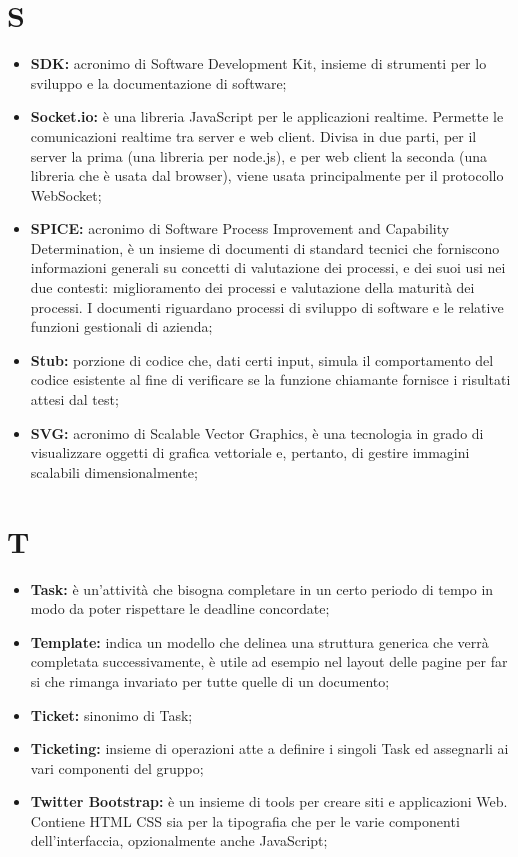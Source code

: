 \section*{\Huge S} %
\label{sec:s}
	\begin{itemize}
		\item \textbf{SDK:} acronimo di Software Development Kit, insieme di strumenti per lo sviluppo e la documentazione di software;	
		\item \textbf{Socket.io:} è una libreria JavaScript per le applicazioni realtime. Permette le comunicazioni realtime tra server e web client. Divisa in due parti, per il server la prima (una libreria per node.js), e per web client la seconda (una libreria che è usata dal browser), viene usata principalmente per il protocollo WebSocket;
		\item \textbf{SPICE:} acronimo di Software Process Improvement and Capability Determination, è un insieme di documenti di standard tecnici che forniscono informazioni generali su concetti di valutazione dei processi, e dei suoi usi nei due contesti: miglioramento dei processi e valutazione della maturità dei processi. I documenti riguardano processi di sviluppo di software e le relative funzioni gestionali di azienda;
		\item \textbf{Stub:} porzione di codice che, dati certi input, simula il comportamento del codice esistente al fine di verificare se la funzione chiamante fornisce i risultati attesi dal test;	
		\item \textbf{SVG:} acronimo di Scalable Vector Graphics, è una tecnologia in grado di visualizzare oggetti di grafica vettoriale e, pertanto, di gestire immagini scalabili dimensionalmente;
	\end{itemize}
\pagebreak

\section*{\Huge T} %
\label{sec:t}
	\begin{itemize}
		\item \textbf{Task:} è un'attività che bisogna completare in un certo periodo di tempo in modo da poter rispettare le deadline concordate;
		\item \textbf{Template:} indica un modello che delinea una struttura generica che verrà completata successivamente, è utile ad esempio nel layout delle pagine per far si che rimanga invariato per tutte quelle di un documento;
		\item \textbf{Ticket:} sinonimo di Task;
		\item \textbf{Ticketing:} insieme di operazioni atte a definire i singoli Task ed assegnarli ai vari componenti del gruppo; 		
		\item \textbf{Twitter Bootstrap:} è un insieme di tools per creare siti e applicazioni Web. Contiene HTML CSS sia per la tipografia che per le varie componenti dell'interfaccia, opzionalmente anche JavaScript;
		
	\end{itemize}
\pagebreak
